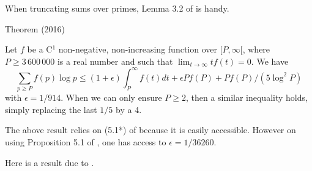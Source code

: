 When truncating sums over primes, Lemma 3.2 of
\cite{Ramare*13d}
is handy.

\begin{thm}{Theorem (2016)}

  Let $f$ be a C${}^1$ non-negative, non-increasing function over
  $[P,\infty[$, where $P\ge 3\,600\,000$ is a real number and such
  that $\lim_{t\rightarrow\infty}tf(t)=0$. 
  We have
  \begin{equation*}
    \sum_{p\ge P} f(p)\log p
    \le (1+\epsilon) \int_P^\infty f(t) dt  +  \epsilon P f(P)  +  P
  f(P) / (5 \log^2 P) 
  \end{equation*}
  with $\epsilon=1/914$. When we can only ensure $P\ge2$, then a similar
  inequality holds, simply replacing the last $1/5$ by a 4.
\end{thm}


The above result  relies on (5.1*) of
\cite{Schoenfeld*76}
because it is easily accessible. However on using
Proposition 5.1 of
\cite{Dusart*07},
one has access to $\epsilon=1/36260$.


  
Here is a result due to 
\cite{Trevino*12}.

